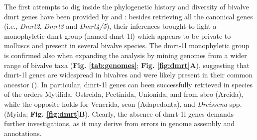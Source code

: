 The first attempts to dig inside the phylogenetic history and diversity of bivalve \gls{dmrt} genes have been provided by \textbf{\cite{li2018foxl2}} and \textbf{\cite{evensen2022comparative}}: besides retrieving all the canonical genes (i.e., \textit{Dmrt2}, \textit{Dmrt3} and \textit{Dmrt4/5}), their inferences brought to light a monophyletic \gls{dmrt} group (named \gls{dmrt-1l}) which appears to be private to molluscs and present in several bivalve species. The \gls{dmrt-1l} monophyletic group is confirmed also when expanding the analysis by mining genomes from a wider range of bivalve taxa (\textbf{Fig. \ref{tab:genomes}}; \textbf{Fig. \ref{fig:dmrt}A}), suggesting that \gls{dmrt-1l} genes are widespread in bivalves and were likely present in their common ancestor (\textbf{\cite{evensen2022comparative}}). In particular, \gls{dmrt-1l} genes can been successfully retrieved in species of the orders Mytilida, Ostreida, Pectinida, Unionida, and from \gls{sbro} (Arcida), while the opposite holds for Venerida, \gls{scon} (Adapedonta), and \textit{Dreissena} spp. (Myida; \textbf{Fig. \ref{fig:dmrt}B}). Clearly, the absence of \gls{dmrt-1l} genes demands further investigations, as it may derive from errors in genome assembly and annotations.

